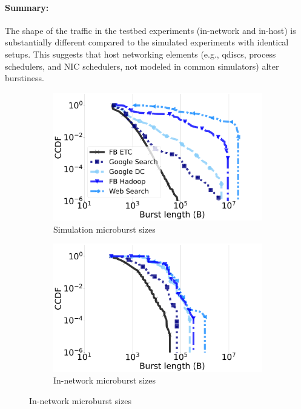 \paragraph{Summary:} The shape of the traffic in the testbed experiments (in-network and in-host) is substantially different compared to the simulated experiments with identical setups. This suggests that host networking elements (e.g., qdiscs, process schedulers, and NIC schedulers, not modeled in common simulators) alter burstiness.

\begin{figure}[t]
\centering
\begin{subfigure}[t]{0.40\linewidth}
    \centering
    \includegraphics[width=1\linewidth]{figs/wccdf_sim.pdf}
    \caption{Simulation microburst sizes}
	\label{fig:wcdf-sim}
\end{subfigure}
\begin{subfigure}[t]{0.40\linewidth}
    \centering
    	\includegraphics[width=1\linewidth]{figs/wccdf_testbed.pdf}
    \caption{In-network microburst sizes}

\end{subfigure}
\end{figure}
